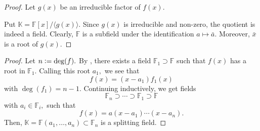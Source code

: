 \rootcanbeadjoined*\label{thm:rootcanbeadjoined2}
\begin{flushright}\hyperref[thm:rootcanbeadjoined]{\upsym}\end{flushright}
\begin{proof}
    Let $g(x)$ be an irreducible factor of $f(x).$

    Put $\mathbb{K} = \mathbb{F}[x]/\langle g(x)\rangle.$ Since $g(x)$ is irreducible and non-zero, the quotient is indeed a field. Clearly, $\mathbb{F}$ is a subfield under the identification $a \mapsto \bar{a}.$ Moreover, $\bar{x}$ is a root of $g(x).$
\end{proof}

\splitfieldexists*\label{thm:splitfieldexists2}
\begin{flushright}\hyperref[thm:splitfieldexists]{\upsym}\end{flushright}
\begin{proof}
    Let $n \vcentcolon= \deg(f).$ By , there exists a field $\mathbb{F}_1 \supset \mathbb{F}$ such that $f(x)$ has a root in $\mathbb{F}_1.$ Calling this root $a_1,$ we see that
    \begin{equation*} 
        f(x) = (x - a_1)f_1(x)
    \end{equation*}
    with $\deg(f_1) = n - 1.$ Continuing inductively, we get fields
    \begin{equation*} 
        \mathbb{F}_n \supset \cdots \supset \mathbb{F}_1 \supset \mathbb{F}
    \end{equation*}
    with $a_i \in \mathbb{F}_i,$ such that
    \begin{equation*} 
        f(x) = a(x - a_1) \cdots (x - a_n).
    \end{equation*}
    Then, $\mathbb{K} = \mathbb{F}(a_1, \ldots, a_n) \subset \mathbb{F}_n$ is a splitting field.
\end{proof}

